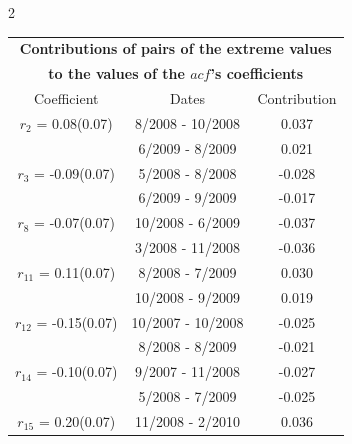
\thispagestyle{empty}
\begin{multicols}{2}{ 
\begin{tabular}{ccc}
\multicolumn{3}{c}{\textbf{Contributions of pairs of the extreme values} }  \vspace{-.10in}  \\ 
\multicolumn{3}{c}{ \textbf{to the values of the $acf$'s coefficients}} \\ 
\hline 
\hline                  Coefficient  &  Dates &  Contribution \\ 
\hline 
  $r_{ 2}$ = 0.08(0.07) &       8/2008 - 10/2008 &        0.037   \vspace{-.10in} \\  
&        6/2009 -  8/2009 &        0.021  \vspace{-.02in} \\ \hline 
  $r_{ 3}$ = -0.09(0.07) &       5/2008 -  8/2008 &       -0.028    \vspace{-.10in} \\ 
  &        6/2009 -  9/2009 &       -0.017  \vspace{-.02in}   \\ \hline 
    $r_{ 8}$ = -0.07(0.07) &      10/2008 -  6/2009 &       -0.037    \vspace{-.10in} \\ 
  &        3/2008 - 11/2008 &       -0.036  \vspace{-.02in}   \\ \hline 
    $r_{11}$ = 0.11(0.07) &       8/2008 -  7/2009 &        0.030   \vspace{-.10in} \\  
&       10/2008 -  9/2009 &        0.019  \vspace{-.02in} \\ \hline 
  $r_{12}$ = -0.15(0.07) &      10/2007 - 10/2008 &       -0.025    \vspace{-.10in} \\ 
  &        8/2008 -  8/2009 &       -0.021  \vspace{-.02in}   \\ \hline 
    $r_{14}$ = -0.10(0.07) &       9/2007 - 11/2008 &       -0.027    \vspace{-.10in} \\ 
  &        5/2008 -  7/2009 &       -0.025  \vspace{-.02in}   \\ \hline 
    $r_{15}$ = 0.20(0.07) &      11/2008 -  2/2010 &        0.036   \vspace{-.10in} \\  

\end{tabular}}
\end{multicols}
